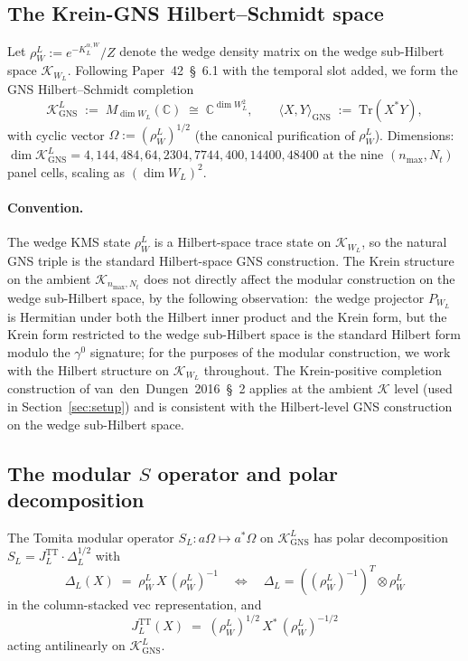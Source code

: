 \documentclass[11pt,a4paper]{article}
\theoremstyle{plain}
\theoremstyle{definition}
\newcommand{\nmax}{n_{\max}}
\newcommand{\Nt}{N_t}
\newcommand{\Krein}{\mathcal{K}}
\newcommand{\C}{\mathbb{C}}
\newcommand{\Tr}{\mathrm{Tr}}
\newcommand{\KL}{K_{L}}
\newcommand{\JL}{J_{L}}
\newcommand{\TT}{\mathrm{TT}}
\newcommand{\GNS}{\mathrm{GNS}}
\begin{document}
\subsection{The Krein-GNS Hilbert--Schmidt space}\label{sec:krein_gns}

Let $\rho_W^L := e^{-\KL^{\alpha, W}}/Z$ denote the wedge density
matrix on the wedge sub-Hilbert space $\Krein_{W_L}$. Following
Paper~42~\S~6.1 with the temporal slot added, we form the GNS
Hilbert--Schmidt completion
\begin{equation}\label{eq:K_GNS_L}
   \Krein_{\GNS}^L
   \;:=\; M_{\dim W_L}(\C)
   \;\cong\; \C^{\dim W_L^2},
   \qquad
   \langle X, Y \rangle_{\GNS} \;:=\; \Tr(X^* Y),
\end{equation}
with cyclic vector $\Omega := (\rho_W^L)^{1/2}$ (the canonical
purification of $\rho_W^L$). Dimensions:\ $\dim \Krein_{\GNS}^L = 4,
144, 484, 64, 2304, 7744, 400, 14400, 48400$ at the nine
$(\nmax, \Nt)$ panel cells, scaling as $(\dim W_L)^2$.

\paragraph{Convention.} The wedge KMS state $\rho_W^L$ is a
Hilbert-space trace state on $\Krein_{W_L}$, so the natural GNS triple
is the standard Hilbert-space GNS construction. The Krein structure
on the ambient $\Krein_{\nmax, \Nt}$ does not directly affect the
modular construction on the wedge sub-Hilbert space, by the
following observation:\ the wedge projector $P_{W_L}$ is Hermitian
under both the Hilbert inner product and the Krein form, but the
Krein form restricted to the wedge sub-Hilbert space is the standard
Hilbert form modulo the $\gamma^0$ signature; for the purposes of the
modular construction, we work with the Hilbert structure on
$\Krein_{W_L}$ throughout. The Krein-positive completion construction
of van~den~Dungen~2016~\S~2 applies at the ambient $\Krein$ level
(used in Section~\ref{sec:setup}) and is consistent with the
Hilbert-level GNS construction on the wedge sub-Hilbert space.

\subsection{The modular $S$ operator and polar decomposition}\label{sec:S_polar_L}

The Tomita modular operator $S_L: a \Omega \mapsto a^* \Omega$ on
$\Krein_{\GNS}^L$ has polar decomposition $S_L = \JL^\TT \cdot
\Delta_L^{1/2}$ with
\begin{equation}\label{eq:Delta_L}
   \Delta_L(X) \;=\; \rho_W^L \, X \, (\rho_W^L)^{-1}
   \quad \Longleftrightarrow\quad
   \Delta_L = ((\rho_W^L)^{-1})^T \otimes \rho_W^L
\end{equation}
in the column-stacked $\mathrm{vec}$ representation, and
\begin{equation}\label{eq:JL_TT}
   \JL^\TT(X)
   \;=\; (\rho_W^L)^{1/2}\, X^*\, (\rho_W^L)^{-1/2}
\end{equation}
acting antilinearly on $\Krein_{\GNS}^L$.
\end{document}
